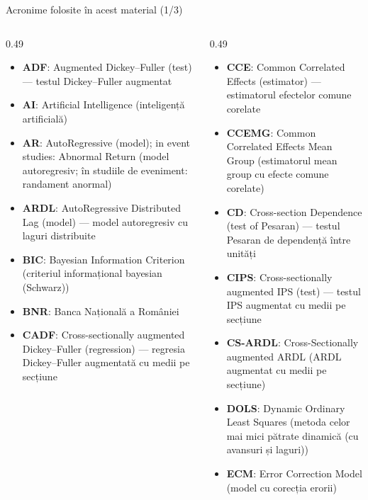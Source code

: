 {
\begin{frame}[noframenumbering]
    \titlepage
\end{frame}
}
\begin{frame}{Acronime folosite în acest material (1/3)}
\begin{columns}[T]
\begin{column}{0.49\textwidth}
\begin{itemize}\setlength{\itemsep}{0pt}
    \item \textbf{ADF}: Augmented Dickey–Fuller (test) — testul Dickey–Fuller augmentat
    \item \textbf{AI}: Artificial Intelligence (inteligență artificială)
    \item \textbf{AR}: AutoRegressive (model); in event studies: Abnormal Return (model autoregresiv; în studiile de eveniment: randament anormal)
    \item \textbf{ARDL}: AutoRegressive Distributed Lag (model) — model autoregresiv cu laguri distribuite
    \item \textbf{BIC}: Bayesian Information Criterion (criteriul informațional bayesian (Schwarz))
    \item \textbf{BNR}: Banca Națională a României
    \item \textbf{CADF}: Cross-sectionally augmented Dickey–Fuller (regression) — regresia Dickey–Fuller augmentată cu medii pe secțiune
\end{itemize}
\end{column}
\begin{column}{0.49\textwidth}
\begin{itemize}\setlength{\itemsep}{0pt}
    \item \textbf{CCE}: Common Correlated Effects (estimator) — estimatorul efectelor comune corelate
    \item \textbf{CCEMG}: Common Correlated Effects Mean Group (estimatorul mean group cu efecte comune corelate)
    \item \textbf{CD}: Cross-section Dependence (test of Pesaran) — testul Pesaran de dependență între unități
    \item \textbf{CIPS}: Cross-sectionally augmented IPS (test) — testul IPS augmentat cu medii pe secțiune
    \item \textbf{CS-ARDL}: Cross-Sectionally augmented ARDL (ARDL augmentat cu medii pe secțiune)
    \item \textbf{DOLS}: Dynamic Ordinary Least Squares (metoda celor mai mici pătrate dinamică (cu avansuri și laguri))
    \item \textbf{ECM}: Error Correction Model (model cu corecția erorii)
\end{itemize}
\end{column}
\end{columns}
\end{frame}
